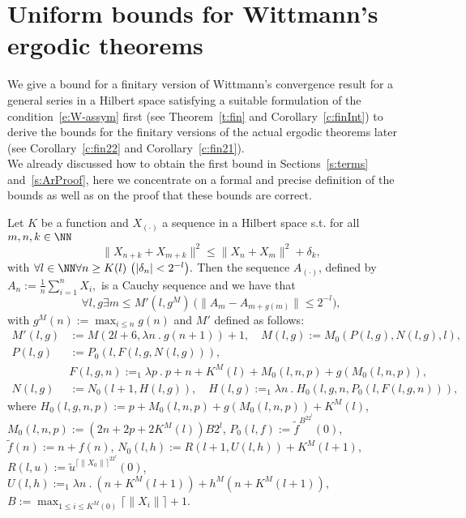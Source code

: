 \section{Uniform bounds for Wittmann's ergodic theorems}\label{s:Main}

We give a bound for a finitary version of Wittmann's convergence result for
a general series in a Hilbert space satisfying a suitable formulation
of the condition~\eqref{e:W-assym} first 
(see Theorem~\ref{t:fin} and Corollary~\ref{c:finInt}) to derive the bounds
for the finitary versions of the actual ergodic theorems later
(see Corollary~\ref{c:fin22} and Corollary~\ref{c:fin21}).\\
We already discussed how to obtain the first bound in Sections~\ref{s:terms} and~\ref{s:ArProof},
here we concentrate on a formal and precise definition of the bounds as well as on the proof
that these bounds are correct.
\begin{thm} \label{t:fin}
Let $K$ be a function and $X_{(\cdot)}$ a sequence in a Hilbert space s.t. for all $m,n,k\in\NN$
\[
\|X_{n+k} + X_{m+k}\|^2 \leq \|X_{n} + X_{m}\|^2+\delta_k,
\]
with
$
\forall l\in\NN\forall n\geq K(l)\ \big( |\delta_{n}|<2^{-l}\big).
$
Then the sequence $A_{(\cdot)}$, defined by
$
A_n:=\frac{1}{n}\sum^n_{i=1}X_i,
$
is a Cauchy sequence and we have that
\[
\forall l,g \exists m\leq M'(l,g^M)\ \big( \|A_{m}-A_{m+g(m)}\|\leq 2^{-l} \big),
\]
with $g^M(n):=\max_{i\leq n} g(n)$ and $M'$ defined as follows:
\begin{align*}
M'(l,g)&:=M(2l+6, \lambda n\ .\ g(n+1))+1,\quad  M(l,g):=M_0( P(l,g), N(l,g), l),\\
P(l,g)&:=P_0(l,F(l,g,N(l,g))),\\
      &F(l,g,n) :=_1 \lambda p\ .\ p+n+K^M(l)+M_0(l,n,p)+g(M_0(l,n,p)),\\
N(l,g)&:=N_0(l+1,H(l,g)),\quad   H(l,g):=_1 \lambda n\ .\  H_0(l,g,n,P_0(l,F(l,g,n))),
\end{align*}
where
$H_0(l,g,n,p):= p + M_0(l,n, p )+g(M_0(l,n, p ))+K^M(l)$, 
$ M_0(l,n,p):=(2n + 2p + 2K^M(l))B2^{l}$, 
$ P_0(l,f):=\tilde f^{B^22^l}(0)$, $\tilde f(n):=n + f(n)$, 
$ N_0(l,h):=R(l+1,U(l,h))+K^M(l+1)$, 
$ R(l,u):=\tilde u^{\lceil \|X_0\| \rceil^22^l}(0)$, 
$ U(l,h):=_1\lambda n\ .\ (n + K^M(l+1))+h^M(n + K^M(l+1))$, 
$ B:=\max_{1\leq i \leq K^M(0)} \lceil \|X_i\| \rceil+1$.

\end{thm}

